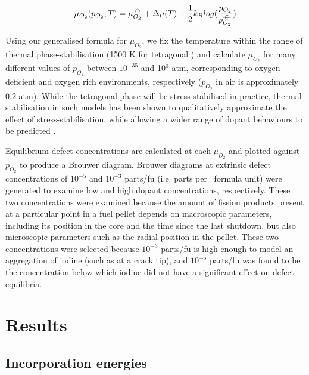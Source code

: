 \begin{equation}
\mu_{O_2}(p_{O_2},T) = \mu^{{-\kern-4pt{\ominus}\kern-4pt-}}_{O_2} + \Delta{\mu(T)} + \frac{1}{2}{k_B}log(\frac{p_{O_2}}{p^{{-\kern-4pt{\ominus}\kern-4pt-}}_{O_2}})
\end{equation}

Using our generalised formula for $\mu_{O_2}$, we fix the temperature within the range of thermal phase-stabilisation (1500 K for tetragonal \zirconia) and calculate $\mu_{O_2}$ for many different values of $p_{O_2}$ between $10^{-35}$ and 10$^{0}$ atm, corresponding to oxygen deficient and oxygen rich environments, respectively ($p_{O_2}$ in air is approximately 0.2 atm). While the tetragonal phase will be stress-stabilised in practice, thermal-stabilisation in such models has been shown to qualitatively approximate the effect of stress-stabilisation, while allowing a wider range of dopant behaviours to be predicted \cite{Bell2016}. 

Equilibrium defect concentrations are calculated at each $\mu_{O_2}$ and plotted against $p_{O_2}$ to produce a Brouwer diagram. Brouwer diagrams at extrinsic defect concentrations of $10^{-5}$ and $10^{-3}$ parts/fu (i.e. parts per \zirconia\ formula unit) were generated to examine low and high dopant concentrations, respectively. These two concentrations were examined because the amount of fission products present at a particular point in a fuel pellet depends on macroscopic parameters, including its position in the core and the time since the last shutdown, but also microscopic parameters such as the radial position in the pellet. These two concentrations were selected because $10^{-3}$ parts/fu is high enough to model an aggregation of iodine (such as at a crack tip), and $10^{-5}$ parts/fu was found to be the concentration below which iodine did not have a significant effect on defect equilibria. 

\section{Results}

\subsection{Incorporation energies}

